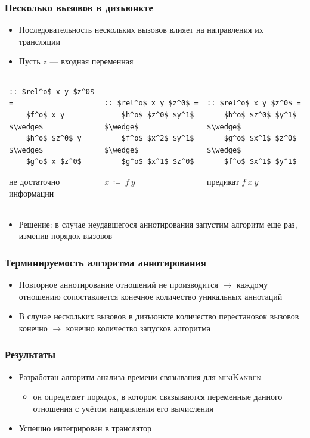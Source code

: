 \documentclass{beamer}
\newcommand{\miniKanren}{\textsc{miniKanren}}
\begin{document}
\begin{frame}[fragile]\frametitle{Несколько вызовов в дизъюнкте}
\begin{itemize}
    \item Последовательность нескольких вызовов влияет на направления их трансляции
    \item Пусть $z$ --- входная переменная
\end{itemize}
\begin{tabular}{p{3.5cm} p{3.5cm} p{3.5cm}}
    \begin{center}
\begin{lstlisting}
:: $rel^o$ x y $z^0$ =
    $f^o$ x y $\wedge$
    $h^o$ $z^0$ y $\wedge$
    $g^o$ x $z^0$
\end{lstlisting}
не достаточно информации
    \end{center}
&
    \begin{center}
\begin{lstlisting}
:: $rel^o$ x y $z^0$ =
    $h^o$ $z^0$ $y^1$ $\wedge$
    $f^o$ $x^2$ $y^1$ $\wedge$
    $g^o$ $x^1$ $z^0$
\end{lstlisting}
$x \ \coloneqq \ f \ y$
    \end{center}
&
    \begin{center}
\begin{lstlisting}
:: $rel^o$ x y $z^0$ =
    $h^o$ $z^0$ $y^1$ $\wedge$
    $g^o$ $x^1$ $z^0$ $\wedge$
    $f^o$ $x^1$ $y^1$
\end{lstlisting}
предикат $f \ x \ y$
    \end{center}
\end{tabular}
\begin{itemize}
    \item Решение: в случае неудавшегося аннотирования запустим алгоритм еще раз, изменив порядок вызовов
\end{itemize}
\end{frame}

\begin{frame}\frametitle{Терминируемость алгоритма аннотирования}
\begin{itemize}
    \item Повторное аннотирование отношений не производится $\rightarrow$ каждому отношению сопоставляется конечное количество уникальных аннотаций
    \item В случае нескольких вызовов в дизъюнкте количество перестановок вызовов конечно $\rightarrow$ конечно количество запусков алгоритма
\end{itemize}
\end{frame}

\begin{frame}\frametitle{Результаты}
\begin{itemize}
    \item Разработан алгоритм анализа времени связывания для \miniKanren{}
        \begin{itemize}
            \item он определяет порядок, в котором связываются переменные данного отношения с учётом направления его вычисления
        \end{itemize}
    \item Успешно интегрирован в транслятор
\end{itemize}
\end{frame}
\end{document}
